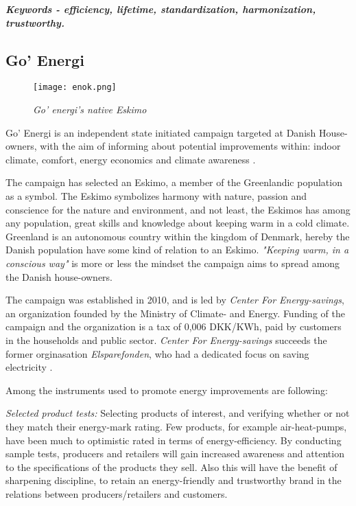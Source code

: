 \documentclass[journal]{IEEEtran}
\begin{document}
\textbf{\textit{Keywords - efficiency, lifetime, standardization, harmonization, trustworthy.}}

\subsection{Go' Energi}
\begin{figure}
\texttt{[image: enok.png]}
\caption{\textit{Go' energi's native Eskimo}}			
\label{fig:enok} %
\end{figure}

Go' Energi is an independent state initiated campaign targeted at Danish House-owners, with the aim of informing about potential improvements within: indoor climate, comfort, energy economics and climate awareness \cite{goenergi}.

The campaign has selected an Eskimo, a member of the Greenlandic population as a symbol. The Eskimo symbolizes harmony with nature, passion and conscience for the nature and environment, and not least, the Eskimos has among any population, great skills and knowledge about keeping warm in a cold climate. Greenland 
is an autonomous country within the kingdom of Denmark, hereby the Danish population have some kind of relation to an Eskimo.  
\textit{"Keeping warm, in a conscious way"} is more or less the mindset the campaign aims to spread among the Danish house-owners. 

The campaign was established in 2010, and is led by \textit{Center For Energy-savings}, an organization founded by the Ministry of Climate- and Energy. Funding of the campaign and the organization is a tax of 0,006 DKK/KWh, paid by customers in the households and public sector. \textit{Center For Energy-savings} succeeds the former orginasation \textit{Elsparefonden}, who had a dedicated focus on saving electricity \cite{annual_ens_10}. 

Among the instruments used to promote energy improvements are following:

\textit{Selected product tests:} Selecting products of interest, and verifying whether or not they match their energy-mark rating. Few products, for example air-heat-pumps, have been much to optimistic rated in terms of energy-efficiency. By conducting sample tests, producers and retailers will gain increased awareness and attention to the specifications of the products they sell. Also this will have the benefit of sharpening discipline, to retain an energy-friendly and trustworthy brand in the relations between producers/retailers and customers.
\end{document}
